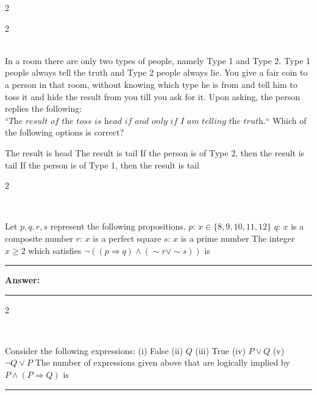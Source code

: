 \documentclass[12pt]{exam}
\begin{document}
\begin{questions}
\begin{multicols*}{2}
\end{multicols*}
\vspace{0.6cm}
\newpage
\begin{multicols*}{2}

 \\[0.2cm]
{\Large In a room there are only two types of people, namely Type 1 and Type 2. Type 1 people always tell the truth and Type 2 people always lie. You give a fair coin to a person in that room, without knowing which type he is from and tell him to toss it and hide the result from you till you ask for it. Upon asking, the person replies the following:\newline
$\textit{``The result of the toss is head if and only if I am telling the truth.``}$\newline
Which of the following options is correct?}
\begin{choices}
  \choice The result is head
  \choice The result is tail
  \choice If the person is of Type 2, then the result is tail
  \choice If the person is of Type 1, then the result is tail
\end{choices}

\end{multicols*}
\vspace{0.6cm}
\newpage
\begin{multicols*}{2}

 \\[0.2cm]
{\Large Let $p, q, r, s$ represent the following propositions.\newline
$p$: $x \in \{8, 9, 10, 11, 12\}$\newline
$q$: $x$ is a composite number\newline
$r$: $x$ is a perfect square\newline
$s$: $x$ is a prime number\newline
The integer $x \geq 2$ which satisfies $\neg ((p \Rightarrow q) \wedge (\sim r \vee \sim s))$ is \rule{2cm}{0.4pt}}

\vspace{0.5cm}
\textbf{Answer:} \rule{3cm}{0.4pt}

\end{multicols*}
\vspace{0.6cm}
\newpage
\begin{multicols*}{2}

 \\[0.2cm]
{\Large Consider the following expressions:\newline
(i) False\newline
(ii) $Q$\newline
(iii) True\newline
(iv) $P \vee Q$\newline
(v) $\neg Q \vee P$\newline
The number of expressions given above that are logically implied by $P \wedge (P \Rightarrow Q)$ is \rule{2cm}{0.4pt}}


\end{multicols*}
\end{questions}
\end{document}

